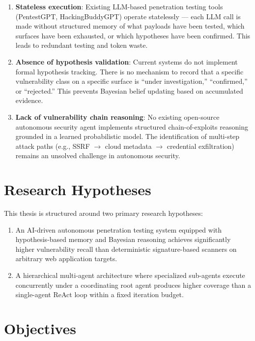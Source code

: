 \documentclass[12pt,a4paper,oneside,openany]{book}
\begin{document}
\begin{enumerate}
\item \textbf{Stateless execution}: Existing LLM-based penetration testing tools (PentestGPT, HackingBuddyGPT) operate statelessly — each LLM call is made without structured memory of what payloads have been tested, which surfaces have been exhausted, or which hypotheses have been confirmed. This leads to redundant testing and token waste.

\item \textbf{Absence of hypothesis validation}: Current systems do not implement formal hypothesis tracking. There is no mechanism to record that a specific vulnerability class on a specific surface is ``under investigation,'' ``confirmed,'' or ``rejected.'' This prevents Bayesian belief updating based on accumulated evidence.

\item \textbf{Lack of vulnerability chain reasoning}: No existing open-source autonomous security agent implements structured chain-of-exploits reasoning grounded in a learned probabilistic model. The identification of multi-step attack paths (e.g., SSRF $\rightarrow$ cloud metadata $\rightarrow$ credential exfiltration) remains an unsolved challenge in autonomous security.
\end{enumerate}

\section{Research Hypotheses}

This thesis is structured around two primary research hypotheses:

\begin{enumerate}
\item[\textbf{H1}] An AI-driven autonomous penetration testing system equipped with hypothesis-based memory and Bayesian reasoning achieves significantly higher vulnerability recall than deterministic signature-based scanners on arbitrary web application targets.

\item[\textbf{H2}] A hierarchical multi-agent architecture where specialized sub-agents execute concurrently under a coordinating root agent produces higher coverage than a single-agent ReAct loop within a fixed iteration budget.
\end{enumerate}

\section{Objectives}
\end{document}

